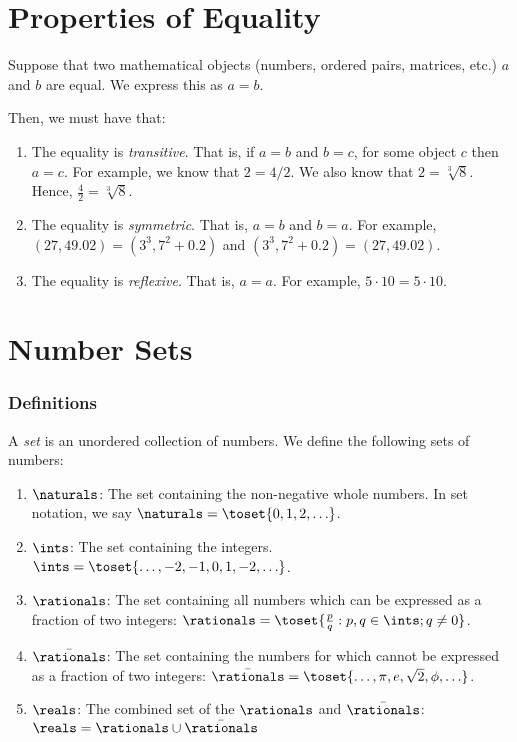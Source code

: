 \documentclass[../proofs.tex]{subfiles}
\begin{document}
\section{Properties of Equality}
  Suppose that two mathematical objects (numbers, ordered pairs, matrices, etc.)
  $a$ and $b$ are equal. We express this as $a = b$.

  Then, we must have that:
  \begin{enumerate}[label=(\alph*)]
    \item The equality is \emph{transitive}. That is, if $a = b$ and $b = c$, for some
    object $c$ then $a = c$. For example, we know that $2 = 4/2$. We also know that
    $2 = \sqrt[3]{8}$. Hence, $\frac{4}{2} = \sqrt[3]{8}$.

    \item The equality is \emph{symmetric}. That is, $a = b$ and $b = a$. For example,
    $(27, 49.02) = (3^3, 7^2 + 0.2)$ and $(3^3, 7^2 + 0.2) = (27, 49.02)$.

    \item The equality is \emph{reflexive}. That is, $a = a$. For example, $5 \cdot 10 = 5 \cdot 10.$
  \end{enumerate}

\section{Number Sets}
  \subsubsection*{Definitions}
  A \emph{set} is an unordered collection of numbers. We define the following sets of numbers:
  \begin{enumerate}
    \item $\naturals$: The set containing the non-negative whole numbers. In set notation, we say $\naturals = \toset{0, 1, 2, \ldots}$.
    \item $\ints$: The set containing the integers. $\ints = \toset{\ldots, -2, -1, 0, 1, -2, \ldots}$.
    \item $\rationals$: The set containing all numbers which can be expressed as a fraction of two integers: $\rationals = \toset{\frac{p}{q}: p, q \in \ints; q \neq 0}$.
    \item $\bar{\rationals}$: The set containing the numbers for which cannot be expressed as a fraction of two integers:
    $\bar{\rationals} = \toset{\ldots, \pi, e, \sqrt{2}, \phi, \ldots}$.
    \item $\reals$: The combined set of the $\rationals$ and $\bar{\rationals}$: $\reals = \rationals \cup \bar{\rationals}$
  \end{enumerate}
\end{document}
